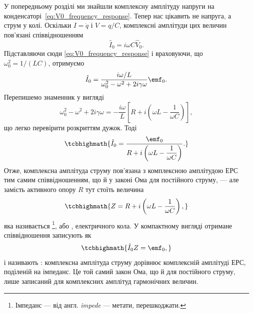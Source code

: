 У попередньому розділі ми знайшли комплексну амплітуду напруги на конденсаторі~\eqref{eq:V0_frequency_response}. Тепер нас цікавить не напруга, а струм у колі. Оскільки $I = \dot{q}$ і $V = q/C$, комплексні амплітуди цих величин пов'язані співвідношенням
\begin{equation}\label{eq:I_from_V}
	\hat{I}_0 = i\omega C \hat{V}_0.
\end{equation}
Підставляючи сюди \eqref{eq:V0_frequency_response} і враховуючи, що $\omega_0^2 = 1/(LC)$, отримуємо
\begin{equation}\label{eq:I0_explicit}
	\hat{I}_0 = \frac{i\omega / L}{\omega_0^2 - \omega^2 + 2i\gamma\omega}\emf_0.
\end{equation}
Перепишемо знаменник у вигляді
\begin{equation}\label{eq:denominator_impedance}
	\omega_0^2 - \omega^2 + 2i\gamma\omega = -\frac{i\omega}{L}\left[R + i\left(\omega L - \frac{1}{\omega C}\right)\right],
\end{equation}
що легко перевірити розкриттям дужок. Тоді
\begin{equation}\label{eq:Ohm_complex_derived}
	\tcbhighmath{
		\hat{I}_0 = \frac{\emf_0}{R + i\left(\omega L - \dfrac{1}{\omega C}\right)}.
	}
\end{equation}
Отже, комплексна амплітуда струму пов'язана з комплексною амплітудою ЕРС тим самим співвідношенням, що й у законі Ома для постійного струму, --- але замість активного опору $R$ тут стоїть величина
\begin{equation}\label{eq:impedance}
	\tcbhighmath{
		Z = R + i\left(\omega L - \frac{1}{\omega C}\right),
	}
\end{equation}
яка називається \footnote{Імпеданс --- від англ. \emph{impede} --- метати, перешкоджати.}, або , електричного кола. У компактному вигляді отримане співвідношення записують як
\begin{equation}\label{eq:Ohm_complex}
	\tcbhighmath{
		\hat{I}_0 Z = \emf_0,
	}
\end{equation}
і називають : комплексна амплітуда струму дорівнює комплексній амплітуді ЕРС, поділеній на імпеданс. Це той самий закон Ома, що й для постійного струму, лише записаний для комплексних амплітуд гармонічних величин.

